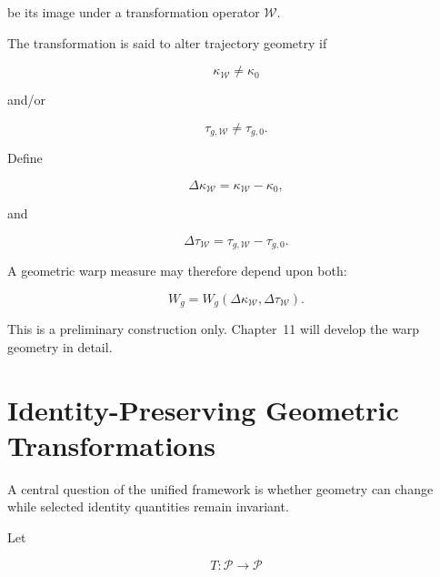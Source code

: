 \documentclass[12pt,oneside]{book}
\newcommand{\Warp}{\mathcal{W}}
\begin{document}
be its image under a transformation operator \(\Warp\).

The transformation is said to alter trajectory geometry if

\begin{equation}
    \kappa_{\Warp}
    \neq
    \kappa_0
\end{equation}

and/or

\begin{equation}
    \tau_{g,\Warp}
    \neq
    \tau_{g,0}.
\end{equation}

Define

\begin{equation}
    \Delta\kappa_{\Warp}
    =
    \kappa_{\Warp}
    -
    \kappa_0,
    \label{eq:warp-curvature-modulation}
\end{equation}

and

\begin{equation}
    \Delta\tau_{\Warp}
    =
    \tau_{g,\Warp}
    -
    \tau_{g,0}.
    \label{eq:warp-torsion-modulation}
\end{equation}

A geometric warp measure may therefore depend upon both:

\begin{equation}
    W_g
    =
    W_g
    \left(
        \Delta\kappa_{\Warp},
        \Delta\tau_{\Warp}
    \right).
    \label{eq:geometric-warp-measure}
\end{equation}

This is a preliminary construction only. Chapter~11 will develop
the warp geometry in detail.


\section{Identity-Preserving Geometric Transformations}
\label{sec:identity-preserving-transformations}

A central question of the unified framework is whether geometry
can change while selected identity quantities remain invariant.

Let

\begin{equation}
    T:
    \mathcal{P}
    \rightarrow
    \mathcal{P}
\end{equation}
\end{document}

